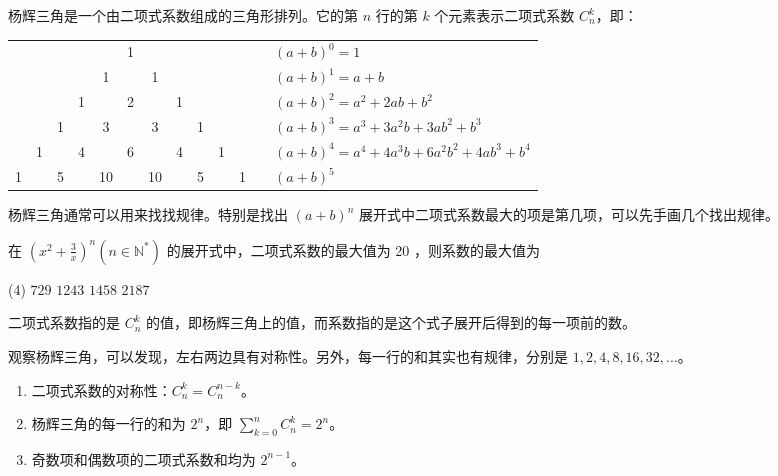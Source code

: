 \begin{definition}
    杨辉三角是一个由二项式系数组成的三角形排列。它的第 $n$ 行的第 $k$ 个元素表示二项式系数 $C_n^k$，即：
    \begin{center}
        \begin{tabular}{*{11}{c}l}
              &   &   &   &    & 1 &    &   &   &   &   & $\quad (a+b)^0 = 1$                                   \\
              &   &   &   & 1  &   & 1  &   &   &   &   & $\quad (a+b)^1 = a + b$                               \\
              &   &   & 1 &    & 2 &    & 1 &   &   &   & $\quad (a+b)^2 = a^2 + 2ab + b^2$                     \\
              &   & 1 &   & 3  &   & 3  &   & 1 &   &   & $\quad (a+b)^3 = a^3 + 3a^2b + 3ab^2 + b^3$           \\
              & 1 &   & 4 &    & 6 &    & 4 &   & 1 &   & $\quad (a+b)^4 = a^4 + 4a^3b + 6a^2b^2 + 4ab^3 + b^4$ \\
            1 &   & 5 &   & 10 &   & 10 &   & 5 &   & 1 & $\quad (a+b)^5$                                       \\
        \end{tabular}
    \end{center}
\end{definition}

杨辉三角通常可以用来找找规律。特别是找出 $(a+b)^n$ 展开式中二项式系数最大的项是第几项，可以先手画几个找出规律。

\begin{example}
    在 $\left(x^{2}+\frac{3}{x}\right)^{n}\left(n \in \mathbb{N}^{*}\right)$ 的展开式中，二项式系数的最大值为 20 ，则系数的最大值为
    \begin{tasks}(4)
        \task $729$
        \task $1243$
        \task $1458$
        \task $2187$
    \end{tasks}
\end{example}

\begin{remark}
    二项式系数指的是 $C_n^k$ 的值，即杨辉三角上的值，而系数指的是这个式子展开后得到的每一项前的数。
\end{remark}

\begin{note}
    \vspace{3cm}
\end{note}

\begin{theorem}
    观察杨辉三角，可以发现，左右两边具有对称性。另外，每一行的和其实也有规律，分别是 $1, 2, 4, 8, 16, 32, ...$。
    \begin{enumerate}
        \item 二项式系数的对称性：$C_n^k = C_n^{n-k}$。
        \item 杨辉三角的每一行的和为 $2^n$，即 $\sum_{k=0}^{n} C_n^k = 2^n$。
        \item 奇数项和偶数项的二项式系数和均为 $2^{n-1}$。
    \end{enumerate}
\end{theorem}

